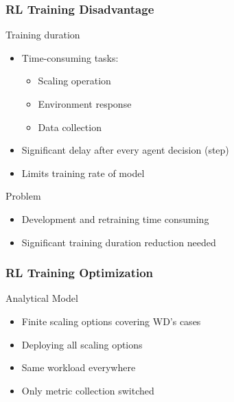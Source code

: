 \documentclass[11pt,t,usepdftitle=false,aspectratio=169]{beamer}
\begin{document}
\begin{frame}
	\frametitle{RL Training Disadvantage}
	
	\begin{alertblock}{Training duration}
		\begin{itemize}
			\item Time-consuming tasks:
			\begin{itemize}
				\item Scaling operation
				\item Environment response
				\item Data collection
			\end{itemize}
			\item Significant delay after every agent decision (step)
			\item Limits training rate of model
		\end{itemize}
	\end{alertblock}
	
	\begin{block}{Problem}
		\begin{itemize}
			\item Development and retraining time consuming
			\item Significant training duration reduction needed
		\end{itemize}
	\end{block}
\end{frame}


\begin{frame}
	\frametitle{RL Training Optimization}
	
	\begin{alertblock}{Analytical Model}
		\begin{itemize}
			\item Finite scaling options covering WD's cases
			\item Deploying all scaling options
			\item Same workload everywhere
			\item Only metric collection switched
		\end{itemize}
	\end{alertblock}
\end{frame}
\end{document}
